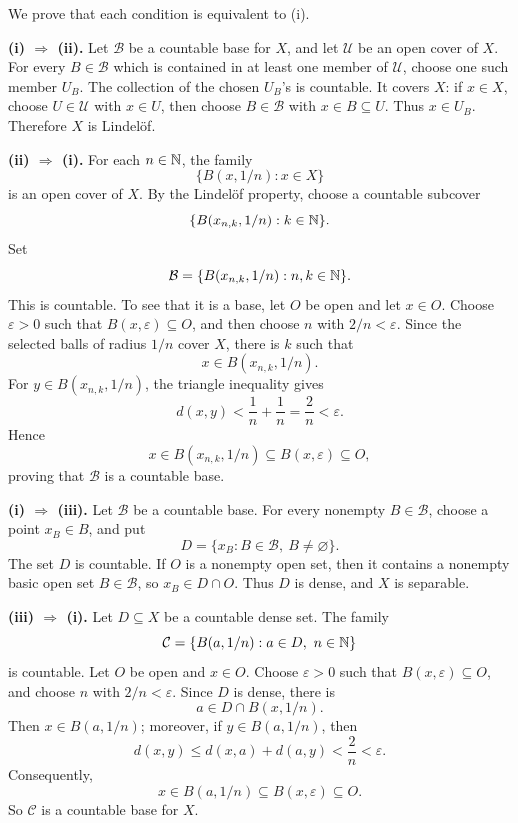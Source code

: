 \documentclass{article}
\begin{document}
\begin{solution}
  We prove that each condition is equivalent to (i).

  \textbf{(i) $\Rightarrow$ (ii).}
  Let $\mathcal{B}$ be a countable base for $X$, and let $\mathcal{U}$ be
  an open cover of $X$. For every $B\in\mathcal{B}$ which is contained in
  at least one member of $\mathcal{U}$, choose one such member $U_B$.
  The collection of the chosen $U_B$'s is countable. It covers $X$:
  if $x\in X$, choose $U\in\mathcal{U}$ with $x\in U$, then choose
  $B\in\mathcal{B}$ with $x\in B\subseteq U$. Thus $x\in U_B$.
  Therefore $X$ is Lindel\"of.

  \textbf{(ii) $\Rightarrow$ (i).}
  For each $n\in\mathbb{N}$, the family
  \[
    \{B(x,1/n):x\in X\}
  \]
  is an open cover of $X$. By the Lindel\"of property, choose a countable
  subcover
  \[
    \{B(x_{n,k},1/n):k\in\mathbb{N}\}.
  \]
  Set
  \[
    \mathcal{B}=\{B(x_{n,k},1/n):n,k\in\mathbb{N}\}.
  \]
  This is countable. To see that it is a base, let $O$ be open and let
  $x\in O$. Choose $\varepsilon>0$ such that $B(x,\varepsilon)\subseteq O$,
  and then choose $n$ with $2/n<\varepsilon$. Since the selected balls of
  radius $1/n$ cover $X$, there is $k$ such that
  \[
    x\in B(x_{n,k},1/n).
  \]
  For $y\in B(x_{n,k},1/n)$, the triangle inequality gives
  \[
    d(x,y)<\frac1n+\frac1n=\frac2n<\varepsilon.
  \]
  Hence
  \[
    x\in B(x_{n,k},1/n)\subseteq B(x,\varepsilon)\subseteq O,
  \]
  proving that $\mathcal{B}$ is a countable base.

  \textbf{(i) $\Rightarrow$ (iii).}
  Let $\mathcal{B}$ be a countable base. For every nonempty
  $B\in\mathcal{B}$, choose a point $x_B\in B$, and put
  \[
    D=\{x_B:B\in\mathcal{B},\ B\ne\varnothing\}.
  \]
  The set $D$ is countable. If $O$ is a nonempty open set, then it contains
  a nonempty basic open set $B\in\mathcal{B}$, so $x_B\in D\cap O$.
  Thus $D$ is dense, and $X$ is separable.

  \textbf{(iii) $\Rightarrow$ (i).}
  Let $D\subseteq X$ be a countable dense set. The family
  \[
    \mathcal{C}=\{B(a,1/n):a\in D,\ n\in\mathbb{N}\}
  \]
  is countable. Let $O$ be open and $x\in O$. Choose $\varepsilon>0$ such
  that $B(x,\varepsilon)\subseteq O$, and choose $n$ with $2/n<\varepsilon$.
  Since $D$ is dense, there is
  \[
    a\in D\cap B(x,1/n).
  \]
  Then $x\in B(a,1/n)$; moreover, if $y\in B(a,1/n)$, then
  \[
    d(x,y)\le d(x,a)+d(a,y)<\frac2n<\varepsilon.
  \]
  Consequently,
  \[
    x\in B(a,1/n)\subseteq B(x,\varepsilon)\subseteq O.
  \]
  So $\mathcal{C}$ is a countable base for $X$.
\end{solution}
\end{document}
